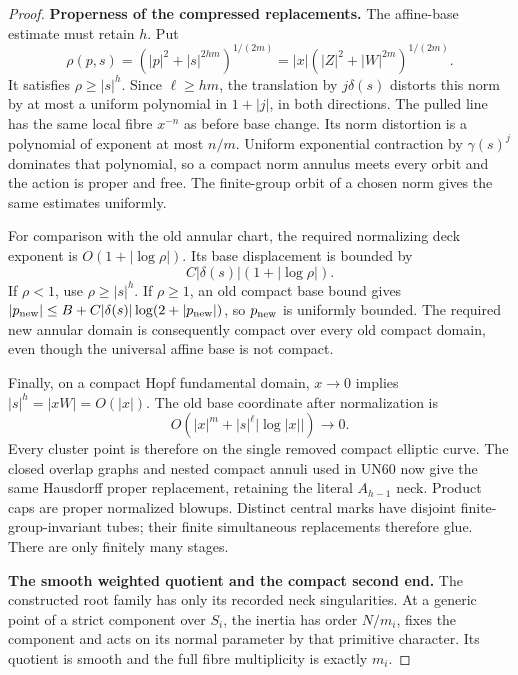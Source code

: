 \begin{proof}
\par\medskip\noindent\textbf{Properness of the compressed replacements.}
The affine-base estimate must
retain \(h\). Put
\[
 \rho(p,s)=
       (|p|^2+|s|^{2hm})^{1/(2m)}
       =|x|(|Z|^2+|W|^{2m})^{1/(2m)} .
 \tag{C.WT.39}
\]
It satisfies \(\rho\ge|s|^h\).
Since \(\ell\ge hm\), the
translation by \(j\delta(s)\)
distorts this norm by at most
a uniform polynomial in
\(1+|j|\), in both directions.
The pulled line has the same
local fibre \(x^{-n}\) as
before base change. Its norm
distortion is a polynomial
of exponent at most \(n/m\).
Uniform exponential contraction
by \(\gamma(s)^j\) dominates
that polynomial, so a compact
norm annulus meets every orbit
and the action is proper
and free. The finite-group
orbit of a chosen norm gives
the same estimates uniformly.

For comparison with the old
annular chart, the required
normalizing deck exponent is
\(O(1+|\log\rho|)\). Its base
displacement is bounded by
\[
              C|\delta(s)|(1+|\log\rho|).
 \tag{C.WT.40}
\]
If \(\rho<1\), use
\(\rho\ge|s|^h\). If \(\rho\ge1\),
an old compact base bound
gives
\(|p_{\rm new}|\le B+
C|\delta(s)|\log(2+|p_{\rm new}|)\),
so \(p_{\rm new}\) is uniformly
bounded. The required new
annular domain is consequently
compact over every old compact
domain, even though the
universal affine base is
not compact.

Finally, on a compact Hopf
fundamental domain, \(x\to0\)
implies \(|s|^h=|xW|=O(|x|)\).
The old base coordinate after
normalization is
\[
          O(|x|^m+|s|^\ell|\log|x||)\longrightarrow0.
 \tag{C.WT.41}
\]
Every cluster point is therefore
on the single removed compact
elliptic curve. The closed
overlap graphs and nested
compact annuli used in UN60
now give the same Hausdorff
proper replacement, retaining
the literal \(A_{h-1}\) neck.
Product caps are proper
normalized blowups. Distinct
central marks have disjoint
finite-group-invariant tubes;
their finite simultaneous
replacements therefore glue.
There are only finitely many
stages.

\par\medskip\noindent\textbf{The smooth weighted quotient and the compact second end.}
The constructed root family
has only its recorded neck
singularities. At a generic
point of a strict component
over \(S_i\), the inertia has
order \(N/m_i\), fixes the
component and acts on its
normal parameter by that
primitive character. Its
quotient is smooth and the
full fibre multiplicity is
exactly \(m_i\).


\end{proof}
